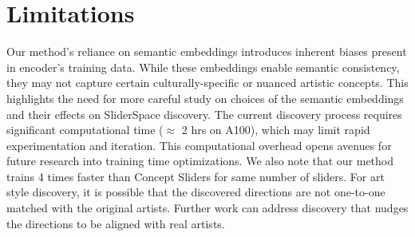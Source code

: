\section{Limitations}
Our method's reliance on semantic embeddings introduces inherent biases present in encoder's training data. While these embeddings enable semantic consistency, they may not capture certain culturally-specific or nuanced artistic concepts. This highlights the need for more careful study on choices of the semantic embeddings and their effects on SliderSpace discovery. The current discovery process requires significant computational time ($\approx$ 2 hrs on A100), which may limit rapid experimentation and iteration. This computational overhead opens avenues for future research into training time optimizations. We also note that our method trains 4 times faster than  Concept Sliders for same number of sliders. For art style discovery, it is possible that the discovered directions are not one-to-one matched with the original artists. Further work can address discovery that nudges the directions to be aligned with real artists. 
